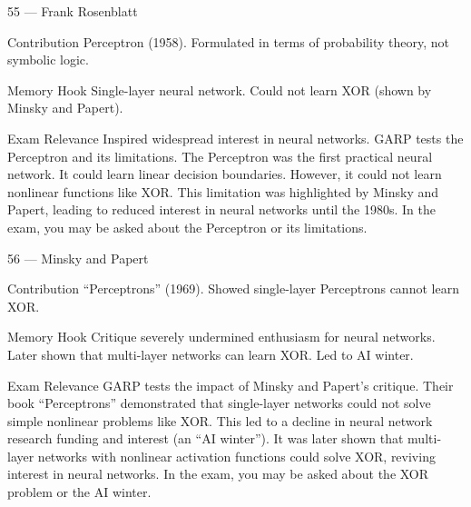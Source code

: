 \documentclass[aspectratio=169,8pt]{beamer}
\begin{document}
	\begin{frame}{55 --- Frank Rosenblatt}
		\begin{block}{Contribution}
			Perceptron (1958). Formulated in terms of probability theory, not symbolic logic.
		\end{block}
		\begin{block}{Memory Hook}
			Single-layer neural network. Could not learn XOR (shown by Minsky and Papert).
		\end{block}
		\begin{block}{Exam Relevance}
			Inspired widespread interest in neural networks. GARP tests the Perceptron and its limitations. The Perceptron was the first practical neural network. It could learn linear decision boundaries. However, it could not learn nonlinear functions like XOR. This limitation was highlighted by Minsky and Papert, leading to reduced interest in neural networks until the 1980s. In the exam, you may be asked about the Perceptron or its limitations.
		\end{block}
	\end{frame}
	
	\begin{frame}{56 --- Minsky and Papert}
		\begin{block}{Contribution}
			``Perceptrons'' (1969). Showed single-layer Perceptrons cannot learn XOR.
		\end{block}
		\begin{block}{Memory Hook}
			Critique severely undermined enthusiasm for neural networks. Later shown that multi-layer networks can learn XOR. Led to AI winter.
		\end{block}
		\begin{block}{Exam Relevance}
			GARP tests the impact of Minsky and Papert's critique. Their book ``Perceptrons'' demonstrated that single-layer networks could not solve simple nonlinear problems like XOR. This led to a decline in neural network research funding and interest (an ``AI winter''). It was later shown that multi-layer networks with nonlinear activation functions could solve XOR, reviving interest in neural networks. In the exam, you may be asked about the XOR problem or the AI winter.
		\end{block}
	\end{frame}
	
\end{document}

